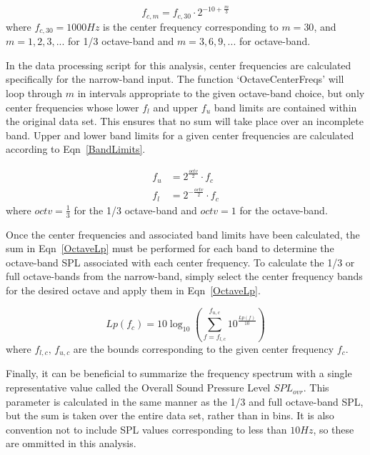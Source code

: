 \documentclass[twocolumn,10pt]{asme2ej}
\begin{document}
\begin{equation} \label{CenterFreqs}
f_{c,m} = f_{c,30}\cdot 2^{-10 + \frac{m}{3}}
\end{equation}
\noindent where $f_{c,30}=1000Hz$ is the center frequency corresponding to $m=30$, and $m=1,2,3,...$ for 1/3 octave-band and $m=3,6,9,...$ for octave-band.

In the data processing script for this analysis, center frequencies are calculated specifically for the narrow-band input.  The function `OctaveCenterFreqs' will loop through $m$ in intervals appropriate to the given octave-band choice, but only center frequencies whose lower $f_l$ and upper $f_u$ band limits are contained within the original data set.  This ensures that no sum will take place over an incomplete band.  Upper and lower band limits for a given center frequencies are calculated according to Eqn~\ref{BandLimits}.

\begin{equation} \label{BandLimits}
\begin{split}
f_u &= 2^{\frac{octv}{2}} \cdot f_c \\
f_l &= 2^{-\frac{octv}{2}} \cdot f_c
\end{split}
\end{equation}
\noindent where $octv=\frac{1}{3}$ for the 1/3 octave-band and $octv=1$ for the octave-band.

Once the center frequencies and associated band limits have been calculated, the sum in Eqn~\ref{OctaveLp} must be performed for each band to determine the octave-band SPL associated with each center frequency.  To calculate the 1/3 or full octave-bands from the narrow-band, simply select the center frequency bands for the desired octave and apply them in Eqn~\ref{OctaveLp}.

\begin{equation} \label{OctaveLp}
Lp(f_c) = 10\log_{10}\left( \sum_{f=f_{l,c}}^{f_{u,c}} 10^{\frac{Lp(f)}{10}} \right)
\end{equation}
\noindent where $f_{l,c},\,f_{u,c}$ are the bounds corresponding to the given center frequency $f_c$.

Finally, it can be beneficial to summarize the frequency spectrum with a single representative value called the Overall Sound Pressure Level $SPL_{ovr}$.  This parameter is calculated in the same manner as the 1/3 and full octave-band SPL, but the sum is taken over the entire data set, rather than in bins.  It is also convention not to include SPL values corresponding to less than $10Hz$, so these are ommitted in this analysis.
\end{document}
